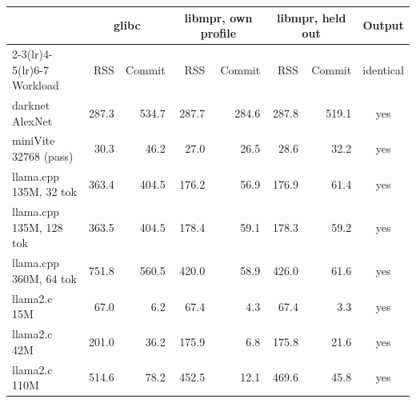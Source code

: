 \begin{tabular}{lrrrrrrc}
\toprule
 & \multicolumn{2}{c}{glibc} & \multicolumn{2}{c}{libmpr, own profile} & \multicolumn{2}{c}{libmpr, held out} & Output \\
\cmidrule(lr){2-3}\cmidrule(lr){4-5}\cmidrule(lr){6-7}
Workload & RSS & Commit & RSS & Commit & RSS & Commit & identical \\
\midrule
darknet AlexNet & 287.3 & 534.7 & 287.7 & 284.6 & 287.8 & 519.1 & yes \\
miniVite 32768 (pass) & 30.3 & 46.2 & 27.0 & 26.5 & 28.6 & 32.2 & yes \\
llama.cpp 135M, 32 tok & 363.4 & 404.5 & 176.2 & 56.9 & 176.9 & 61.4 & yes \\
llama.cpp 135M, 128 tok & 363.5 & 404.5 & 178.4 & 59.1 & 178.3 & 59.2 & yes \\
llama.cpp 360M, 64 tok & 751.8 & 560.5 & 420.0 & 58.9 & 426.0 & 61.6 & yes \\
llama2.c 15M & 67.0 & 6.2 & 67.4 & 4.3 & 67.4 & 3.3 & yes \\
llama2.c 42M & 201.0 & 36.2 & 175.9 & 6.8 & 175.8 & 21.6 & yes \\
llama2.c 110M & 514.6 & 78.2 & 452.5 & 12.1 & 469.6 & 45.8 & yes \\
\bottomrule
\end{tabular}
